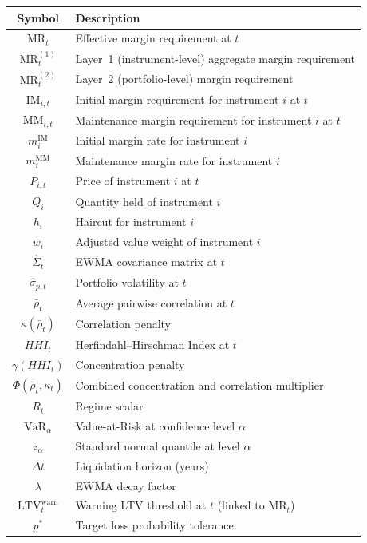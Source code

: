 \documentclass[12pt, a4paper]{article}
\newcommand{\MR}{\mathrm{MR}}
\newcommand{\IM}{\mathrm{IM}}
\newcommand{\MM}{\mathrm{MM}}
\newcommand{\VaR}{\mathrm{VaR}}
\newcommand{\LTV}{\mathrm{LTV}}
\begin{document}
\begin{longtable}{cl}
\toprule
\textbf{Symbol} & \textbf{Description} \\
\midrule
\endhead
$\MR_t$                          & Effective margin requirement at $t$ \\
$\MR_t^{(1)}$                    & Layer~1 (instrument-level) aggregate margin requirement \\
$\MR_t^{(2)}$                    & Layer~2 (portfolio-level) margin requirement \\
$\IM_{i,t}$                      & Initial margin requirement for instrument $i$ at $t$ \\
$\MM_{i,t}$                      & Maintenance margin requirement for instrument $i$ at $t$ \\
$m_i^{\IM}$                      & Initial margin rate for instrument $i$ \\
$m_i^{\MM}$                      & Maintenance margin rate for instrument $i$ \\
$P_{i,t}$                        & Price of instrument $i$ at $t$ \\
$Q_i$                            & Quantity held of instrument $i$ \\
$h_i$                            & Haircut for instrument $i$ \\
$w_i$                            & Adjusted value weight of instrument $i$ \\
$\hat{\Sigma}_t$                 & EWMA covariance matrix at $t$ \\
$\hat{\sigma}_{p,t}$             & Portfolio volatility at $t$ \\
$\bar{\rho}_t$                   & Average pairwise correlation at $t$ \\
$\kappa(\bar{\rho}_t)$           & Correlation penalty \\
$HHI_t$                          & Herfindahl--Hirschman Index at $t$ \\
$\gamma(HHI_t)$                  & Concentration penalty \\
$\Phi(\bar{\rho}_t, \kappa_t)$   & Combined concentration and correlation multiplier \\
$R_t$                            & Regime scalar \\
$\VaR_\alpha$                    & Value-at-Risk at confidence level $\alpha$ \\
$z_\alpha$                       & Standard normal quantile at level $\alpha$ \\
$\Delta t$                       & Liquidation horizon (years) \\
$\lambda$                        & EWMA decay factor \\
$\LTV^{\mathrm{warn}}_t$        & Warning LTV threshold at $t$ (linked to $\MR_t$) \\
$p^*$                            & Target loss probability tolerance \\
\bottomrule
\end{longtable}
\end{document}
